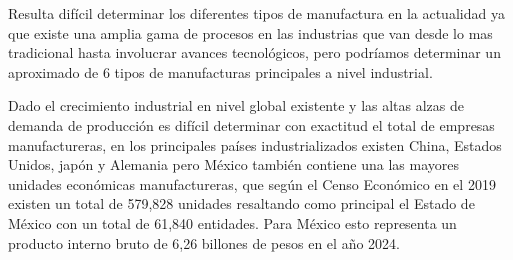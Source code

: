     Resulta difícil determinar los diferentes tipos de manufactura en la actualidad ya que existe una amplia gama de procesos en las industrias que van desde lo mas tradicional hasta involucrar avances tecnológicos, pero podríamos determinar un aproximado de 6 tipos de manufacturas principales a nivel industrial.\cite{Tipos}
     
    Dado el crecimiento industrial en nivel global existente y las altas alzas de demanda de producción es difícil determinar con exactitud el total de empresas manufactureras, en los principales países industrializados existen China, Estados Unidos, japón y Alemania pero México también contiene una las mayores unidades económicas manufactureras, que según el Censo Económico en el 2019 existen un total de 579,828 unidades resaltando como principal el Estado de México con un total de 61,840 entidades. Para México esto representa un producto interno bruto de 6,26 billones de pesos en el año 2024.\cite{industrias} 
    
    
    
    
    
